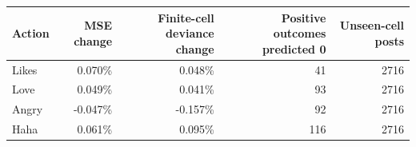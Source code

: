 \begin{tabular}{lrrrr}
\toprule
Action & MSE change & Finite-cell deviance change & Positive outcomes predicted 0 & Unseen-cell posts \\
\midrule
Likes & 0.070\% & 0.048\% & 41 & 2716 \\
Love & 0.049\% & 0.041\% & 93 & 2716 \\
Angry & -0.047\% & -0.157\% & 92 & 2716 \\
Haha & 0.061\% & 0.095\% & 116 & 2716 \\
\bottomrule
\end{tabular}
